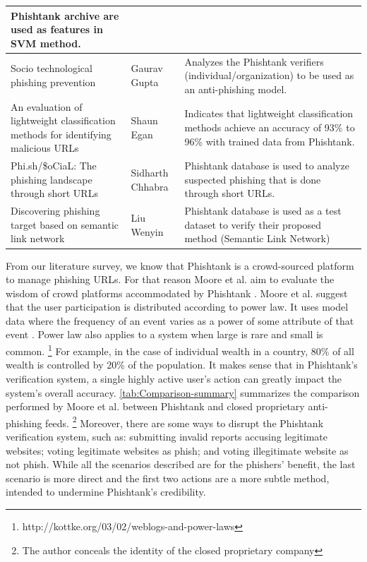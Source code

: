 \begin{longtable}{>{\raggedright}p{3cm}>{\raggedright}p{2cm}>{\raggedright}p{5cm}}
{Phishtank archive are used as features in SVM method.}\tabularnewline
\midrule 
{\scriptsize{}Socio technological phishing prevention \citep{gupta:2011}} & {\scriptsize{}Gaurav Gupta} & {\scriptsize{}Analyzes the Phishtank verifiers (individual/organization)
to be used as an anti-phishing model.}\tabularnewline
\midrule 
{\scriptsize{}An evaluation of lightweight classification methods
for identifying malicious URLs \citep{egan:2011}} & {\scriptsize{}Shaun Egan} & {\scriptsize{}Indicates that lightweight classification methods achieve
an accuracy of 93\% to 96\% with trained data from Phishtank.}\tabularnewline
\midrule 
{\scriptsize{}Phi.sh/\$oCiaL: The phishing landscape through short
URLs \citep{chhabra:2011}} & {\scriptsize{}Sidharth Chhabra} & {\scriptsize{}Phishtank database is used to analyze suspected phishing
that is done through short URLs.}\tabularnewline
\midrule 
{\scriptsize{}Discovering phishing target based on semantic link network
\citep{wenyin:2010}} & {\scriptsize{}Liu Wenyin} & {\scriptsize{}Phishtank database is used as a test dataset to verify
their proposed method (Semantic Link Network) }\tabularnewline
\end{longtable}

From our literature survey, we know that Phishtank is a crowd-sourced
platform to manage phishing URLs. For that reason Moore et al. aim
to evaluate the wisdom of crowd platforms accommodated by Phishtank
\citep{moore:2008}. Moore et al. suggest that the user participation
is distributed according to power law. It uses model data where the
frequency of an event varies as a power of some attribute of that
event \citep{lai}. Power law also applies to a system when large
is rare and small is common.%
\footnote{http://kottke.org/03/02/weblogs-and-power-laws%
} For example, in the case of individual wealth in a country, 80\%
of all wealth is controlled by 20\% of the population. It makes sense
that in Phishtank's verification system, a single highly active user's
action can greatly impact the system's overall accuracy. \autoref{tab:Comparison-summary}
summarizes the comparison performed by Moore et al. \citep{moore:2008}
between Phishtank and closed proprietary anti-phishing feeds.%
\footnote{The author conceals the identity of the closed proprietary company%
} Moreover, there are some ways to disrupt the Phishtank verification
system, such as: submitting invalid reports accusing legitimate websites;
voting legitimate websites as phish; and voting illegitimate website
as not phish. While all the scenarios described are for the phishers'
benefit, the last scenario is more direct and the first two actions
are a more subtle method, intended to undermine Phishtank's credibility.

